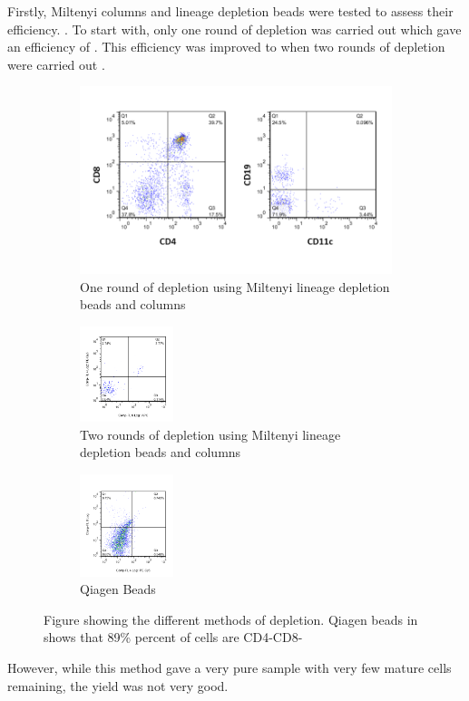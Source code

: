 Firstly, Miltenyi columns and lineage depletion beads were tested to assess their efficiency. 
.
To start with, only one round of depletion was carried out which gave an efficiency of .
This efficiency was improved to  when two rounds of depletion were carried out . 
\begin{figure}
	\begin{subfigure}{\textwidth}
	\includegraphics[width=\textwidth]{Figures/1rounddepletion.png}
	\caption{One round of depletion using Miltenyi lineage depletion beads and columns}
	\end{subfigure}
	\hfill
	\begin{subfigure}{\textwidth}
	\includegraphics[width=0.3\textwidth]{Figures/2rounddepletion.png}
	\caption{Two rounds of depletion using Miltenyi lineage depletion beads and columns}
	\label{subfig:2miltenyi}
	\end{subfigure}
	\hfill
	\begin{subfigure}{\textwidth}
	\includegraphics[width=0.3\textwidth] {Figures/Qiagenbeads.png}
	\caption{Qiagen Beads}
	\label{subfig:Qiagen}
	\end{subfigure}
	
\caption{Figure showing the different methods of depletion. Qiagen beads in shows that 89\% percent of cells are CD4-CD8-}
\end{figure}
However, while this method gave a very pure sample with very few mature cells remaining, the yield was not very good.

